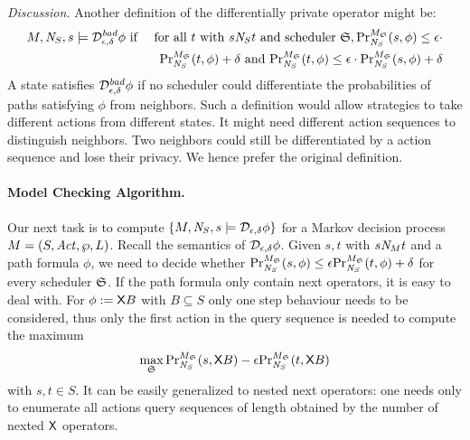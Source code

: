 \noindent
\emph{Discussion.}
Another definition of the differentially private operator
might be:
\begin{eqnarray*}
  M, \neighbor{S}, s \models \dpriv{\epsilon}{\delta}^{\mathit{bad}} \phi
  & \textmd{ if } &
  \textmd{for all } t \textmd{ with } s \neighbor{S} t \textmd{ and
  scheduler } \scheduler{S},
  \myPr{s}{M_{\scheduler{S}}}{\neighbor{S}}{\phi} \leq
  \epsilon \cdot\\
  && \myPr{t}{M_{\scheduler{S}}}{\neighbor{S}}{\phi} + \delta \textmd{ and }
  \myPr{t}{M_{\scheduler{S}}}{\neighbor{S}}{\phi} \leq
  \epsilon \cdot \myPr{s}{M_{\scheduler{S}}}{\neighbor{S}}{\phi}
  + \delta
\end{eqnarray*}
A state satisfies $\dpriv{\epsilon}{\delta}^{\mathit{bad}} \phi$ if
no scheduler could differentiate the probabilities of paths satisfying
$\phi$ from neighbors. Such a definition would allow strategies to
take different actions from different states. It might need different
action sequences to distinguish neighbors. Two neighbors could still be
differentiated by a action sequence and lose their privacy. We hence
prefer the original definition.

\paragraph{Model Checking Algorithm.}

Our next task is to compute $\{ M, \neighbor{S}, s \models
\dpriv{\epsilon}{\delta} \phi \}$ for a Markov decision process $M =
(S, \Act, \wp, L)$. Recall the semantics of $\dpriv{\epsilon}{\delta}
\phi$. Given $s, t$ with $s \neighbor{M} t$ and a path formula
$\phi$, we need to decide whether
$\myPr{s}{M_{\scheduler{S}}}{\neighbor{S}}{\phi} \leq
\epsilon \myPr{t}{M_{\scheduler{S}}}{\neighbor{S}}{\phi} + \delta$
for every scheduler $\scheduler{S}$.
If the path formula only contain next operators, it is easy to deal with. For $\phi:=\X B$ with $B\subseteq S$ only one step behaviour needs to be considered, thus only the first action in the query sequence is needed to compute the maximum
\begin{eqnarray}
  \label{eqn:max-nextB}
\max_{\scheduler{S}}
\myPr{s}{M_{\scheduler{S}}}{\neighbor{S}}{\gX B} -
\epsilon \myPr{t}{M_{\scheduler{S}}}{\neighbor{S}}{\gX B}
\end{eqnarray}
with $s, t \in S$. It can be easily generalized to nested next operators:  one needs only to enumerate 
all actions query sequences of length obtained by the number of nexted $\X$ operators. 

